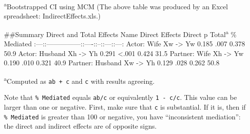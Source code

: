 \documentclass[
  man,floatsintext]{apa6}
\begin{document}
\textsuperscript{a}Bootstrapped CI using MCM
(The above table was produced by an Excel spreadsheet: IndirectEffects.xls.)

\#\#Summary Direct and Total Effects
\textbar Name\textbar{} Direct Effects \textbar Direct\textbar{} p \textbar Total\textsuperscript{a}\textbar{} \% Mediated\textbar{}
\textbar:---:\textbar:---------------:\textbar:----:\textbar:--:\textbar:---:\textbar:---:\textbar{}
\textbar Actor: Wife\textbar{} Xw -\textgreater{} Yw \textbar{} 0.185 \textbar{} .007\textbar{} 0.378\textbar{} 50.9\textbar{}
\textbar Actor: Husband\textbar{} Xh -\textgreater{} Yh \textbar{} 0.291\textbar{} \textless.001\textbar{} 0.424\textbar{} 31.5\textbar{}
\textbar Partner: Wife\textbar{} Xh -\textgreater{} Yw \textbar{} 0.190\textbar{} .010\textbar{} 0.321\textbar{} 40.9\textbar{}
\textbar Partner: Husband\textbar{} Xw -\textgreater{} Yh \textbar{} 0.129\textbar{} .028\textbar{} 0.262\textbar{} 50.8\textbar{}

\textsuperscript{a}Computed as \texttt{ab\ +\ c\textquotesingle{}} and \texttt{c} with results agreeing.

Note that \texttt{\%\ Mediated} equals \texttt{ab/c} or equivalently \texttt{1\ -\ c\textquotesingle{}/c}. This value can be larger than one or negative. First, make sure that \texttt{c} is substantial. If it is, then if \texttt{\%\ Mediated} is greater than 100 or negative, you have ``inconsistent mediation'': the direct and indirect effects are of opposite signs.


\clearpage
\renewcommand{\listfigurename}{Figure captions}

\clearpage
\renewcommand{\listtablename}{Table captions}
\end{document}
